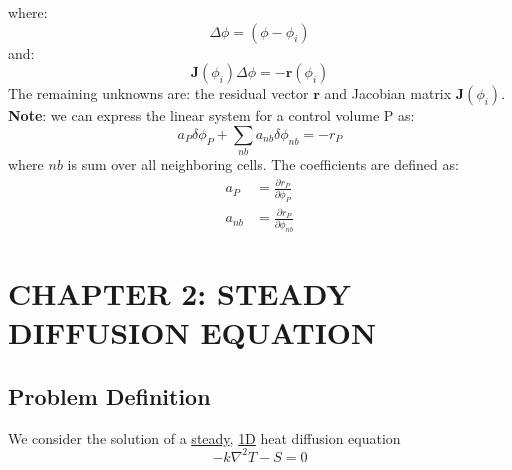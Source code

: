 \documentclass[14pt]{article}
\begin{document}
where:
\begin{equation}
\Delta \phi = (\phi - \phi_i)
\end{equation}
and:
\begin{equation}
\textbf{J}(\phi_i)\Delta \phi = -\textbf{r}(\phi_i)
\end{equation}
The remaining unknowns are: the residual vector \(\textbf{r}\) and Jacobian matrix \(\textbf{J}(\phi_i)\).\\
\textbf{Note}: we can express the linear system for a control volume P as:
\begin{equation}
a_P\delta \phi_P + \sum_{nb} a_{nb}\delta \phi_{nb} = -r_P
\end{equation}
where \(nb\) is sum over all neighboring cells.  The coefficients are defined as:
\begin{align}
a_P &= \frac{\partial r_P}{\partial \phi_P}\\
a_{nb} &= \frac{\partial r_P}{\partial \phi_{nb}}
\end{align}

\clearpage
\section{CHAPTER 2: STEADY DIFFUSION EQUATION}
\label{sec:orgc1c3b52}
\subsection{Problem Definition}
\label{sec:orge171925}
We consider the solution of a \uline{steady}, \uline{1D} heat diffusion equation
\begin{equation}
-k \nabla^2 T - S = 0
\end{equation}
\end{document}
